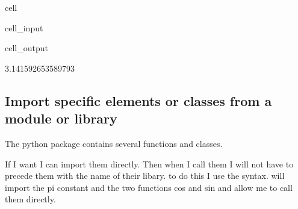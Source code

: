 \documentclass[letterpaper,10pt,english]{jupyterBook}
\begin{document}
\begin{sphinxuseclass}{cell}\begin{sphinxVerbatimInput}

\begin{sphinxuseclass}{cell_input}
\begin{sphinxVerbatim}[commandchars=\\\{\}]
 

\end{sphinxVerbatim}

\end{sphinxuseclass}\end{sphinxVerbatimInput}
\begin{sphinxVerbatimOutput}

\begin{sphinxuseclass}{cell_output}
\begin{sphinxVerbatim}[commandchars=\\\{\}]
3.141592653589793
\end{sphinxVerbatim}

\end{sphinxuseclass}\end{sphinxVerbatimOutput}

\end{sphinxuseclass}

\subsection{Import specific elements or classes from a module or library}
\label{\detokenize{content/04_PythonEssentials/PythonPackagesEtc:import-specific-elements-or-classes-from-a-module-or-library}}
\sphinxAtStartPar
The python package  contains several functions and classes.

\sphinxAtStartPar
If I want I can import them directly. Then when I call them I will not have to precede them with the name of their libary. to do this I use the  syntax.   will import the pi constant and the two functions cos and sin and allow me to call them directly.
\end{document}
